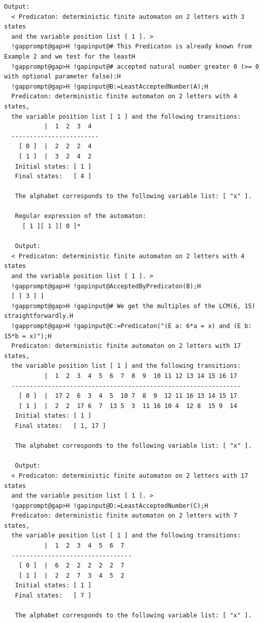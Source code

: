 \documentclass[a4paper,11pt]{report}
\begin{document}
{{{\begin{Verbatim}[commandchars=!@H,fontsize=\small,frame=single,label=Example]
   Output:
  < Predicaton: deterministic finite automaton on 2 letters with 3 states 
  and the variable position list [ 1 ]. >
  !gapprompt@gap>H !gapinput@# This Predicaton is already known from Example 2 and we test for the leastH
  !gapprompt@gap>H !gapinput@# accepted natural number greater 0 (>= 0 with optional parameter false):H
  !gapprompt@gap>H !gapinput@B:=LeastAcceptedNumber(A);H
  Predicaton: deterministic finite automaton on 2 letters with 4 states, 
  the variable position list [ 1 ] and the following transitions:
           |  1  2  3  4  
  ------------------------
    [ 0 ]  |  2  2  2  4  
    [ 1 ]  |  3  2  4  2  
   Initial states: [ 1 ]
   Final states:   [ 4 ]
  
   The alphabet corresponds to the following variable list: [ "x" ].
  
   Regular expression of the automaton:
     [ 1 ][ 1 ][ 0 ]*
  
   Output:
  < Predicaton: deterministic finite automaton on 2 letters with 4 states 
  and the variable position list [ 1 ]. >
  !gapprompt@gap>H !gapinput@AcceptedByPredicaton(B);H
  [ [ 3 ] ]
  !gapprompt@gap>H !gapinput@# We get the multiples of the LCM(6, 15) straightforwardly.H
  !gapprompt@gap>H !gapinput@C:=Predicaton("(E a: 6*a = x) and (E b: 15*b = x)");H
  Predicaton: deterministic finite automaton on 2 letters with 17 states, 
  the variable position list [ 1 ] and the following transitions:
           |  1  2  3  4  5  6  7  8  9  10 11 12 13 14 15 16 17 
  ---------------------------------------------------------------
    [ 0 ]  |  17 2  6  3  4  5  10 7  8  9  12 11 16 13 14 15 17 
    [ 1 ]  |  2  2  17 6  7  13 5  3  11 16 10 4  12 8  15 9  14 
   Initial states: [ 1 ]
   Final states:   [ 1, 17 ]
  
   The alphabet corresponds to the following variable list: [ "x" ].
  
   Output:
  < Predicaton: deterministic finite automaton on 2 letters with 17 states 
  and the variable position list [ 1 ]. >
  !gapprompt@gap>H !gapinput@D:=LeastAcceptedNumber(C);H
  Predicaton: deterministic finite automaton on 2 letters with 7 states, 
  the variable position list [ 1 ] and the following transitions:
           |  1  2  3  4  5  6  7  
  ---------------------------------
    [ 0 ]  |  6  2  2  2  2  2  7  
    [ 1 ]  |  2  2  7  3  4  5  2  
   Initial states: [ 1 ]
   Final states:   [ 7 ]
  
   The alphabet corresponds to the following variable list: [ "x" ].
  

\end{Verbatim}}}}
\end{document}

